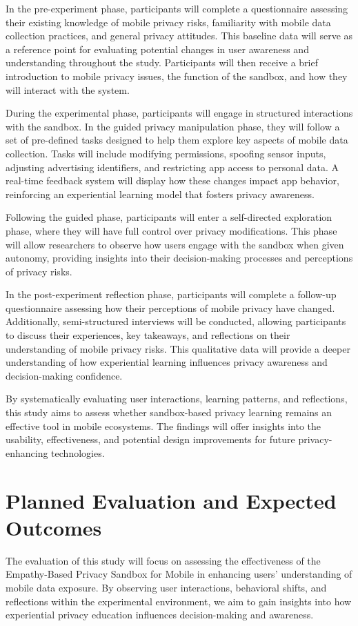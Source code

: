 \documentclass[acmlarge, nonacm]{acmart}
\begin{document}
In the pre-experiment phase, participants will complete a questionnaire assessing their existing knowledge of mobile privacy risks, familiarity with mobile data collection practices, and general privacy attitudes. This baseline data will serve as a reference point for evaluating potential changes in user awareness and understanding throughout the study. Participants will then receive a brief introduction to mobile privacy issues, the function of the sandbox, and how they will interact with the system.

During the experimental phase, participants will engage in structured interactions with the sandbox. In the guided privacy manipulation phase, they will follow a set of pre-defined tasks designed to help them explore key aspects of mobile data collection. Tasks will include modifying permissions, spoofing sensor inputs, adjusting advertising identifiers, and restricting app access to personal data. A real-time feedback system will display how these changes impact app behavior, reinforcing an experiential learning model that fosters privacy awareness.

Following the guided phase, participants will enter a self-directed exploration phase, where they will have full control over privacy modifications. This phase will allow researchers to observe how users engage with the sandbox when given autonomy, providing insights into their decision-making processes and perceptions of privacy risks.

In the post-experiment reflection phase, participants will complete a follow-up questionnaire assessing how their perceptions of mobile privacy have changed. Additionally, semi-structured interviews will be conducted, allowing participants to discuss their experiences, key takeaways, and reflections on their understanding of mobile privacy risks. This qualitative data will provide a deeper understanding of how experiential learning influences privacy awareness and decision-making confidence.

By systematically evaluating user interactions, learning patterns, and reflections, this study aims to assess whether sandbox-based privacy learning remains an effective tool in mobile ecosystems. The findings will offer insights into the usability, effectiveness, and potential design improvements for future privacy-enhancing technologies.

\section{Planned Evaluation and Expected Outcomes}
The evaluation of this study will focus on assessing the effectiveness of the Empathy-Based Privacy Sandbox for Mobile in enhancing users' understanding of mobile data exposure. By observing user interactions, behavioral shifts, and reflections within the experimental environment, we aim to gain insights into how experiential privacy education influences decision-making and awareness.
\end{document}
